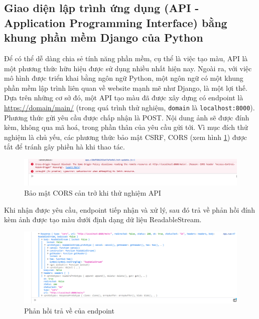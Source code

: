 \documentclass[a4paper, 12pt]{article}
\begin{document}
\subsection{Giao diện lập trình ứng dụng (API - Application Programming Interface) bằng khung phần mềm Django của Python}
Để có thể dễ dàng chia sẻ tính năng phần mềm, cụ thể là việc tạo màu, API là một phương thức hữu hiệu được sử dụng nhiều nhất hiện nay. Ngoài ra, với việc mô hình được triển khai bằng ngôn ngữ Python, một ngôn ngữ có một khung phần mềm lập trình liên quan về website mạnh mẽ như Django, là một lợi thế.\vspace{5pt}\\
Dựa trên những cơ sở đó, một API tạo màu đã được xây dựng có endpoint là \href{https://domain/main/}{https://domain/main/} (trong quá trình thử nghiệm, \texttt{domain} là \texttt{localhost:8000}). Phương thức gửi yêu cầu được chấp nhận là POST. Nội dung ảnh sẽ được đính kèm, không qua mã hoá, trong phần thân của yêu cầu gửi tới. Vì mục đích thử nghiệm là chủ yếu, các phương thức bảo mật CSRF, CORS (xem hình \ref{fig:cors}) được tắt để tránh gây phiền hà khi thao tác.

\begin{figure}[!h]
\centering
\includegraphics[width=16cm]{images/cors.png}
\caption{Bảo mật CORS cản trở khi thử nghiệm API}
\label{fig:cors}
\end{figure}

\noindent
Khi nhận được yêu cầu, endpoint tiếp nhận và xử lý, sau đó trả về phản hồi đính kèm ảnh được tạo màu dưới định dạng dữ liệu ReadableStream.

\begin{figure}[!h]
\centering
\includegraphics[width=16cm]{images/readablestream.png}
\caption{Phản hồi trả về của endpoint}
\end{figure}
\end{document}
